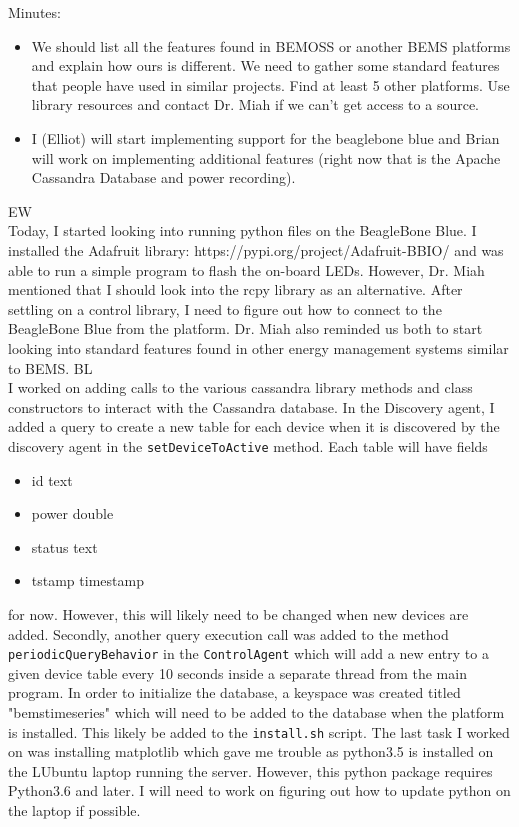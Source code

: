 \documentclass[fontsize=11pt, %
                             paper=letter, %
                             openany, %
                             captions=tableheading,
                             index=totoc,
                             hyperref]{labbook}
\begin{document}
Minutes:
\begin{itemize}
\item We should list all the features found in BEMOSS or another BEMS platforms and explain how ours is different. We need to gather some standard features that people have used in similar projects. Find at least 5 other platforms. Use library resources and contact Dr. Miah if we can't get access to a source.
\item I (Elliot) will start implementing support for the beaglebone blue and Brian will work on implementing additional features (right now that is the Apache Cassandra Database and power recording).
\end{itemize}

EW\\
Today, I started looking into running python files on the BeagleBone Blue. I installed the Adafruit library: https://pypi.org/project/Adafruit-BBIO/ and was able to run a simple program to flash the on-board LEDs. However, Dr. Miah mentioned that I should look into the rcpy library as an alternative. After settling on a control library, I need to figure out how to connect to the BeagleBone Blue from the platform.
Dr. Miah also reminded us both to start looking into standard features found in other energy management systems similar to BEMS.
\medbreak\noindent
BL\\
I worked on adding calls to the various cassandra library methods and class constructors to interact with the Cassandra database. In the Discovery agent, I added a query to create a new table for each device when it is discovered by the discovery agent in the \texttt{setDeviceToActive} method. Each table will have fields
\begin{itemize}
\item id text
\item power double
\item status text
\item tstamp timestamp
\end{itemize}
for now. However, this will likely need to be changed when new devices are added. Secondly, another query execution call was added to the method \texttt{periodicQueryBehavior} in the \texttt{ControlAgent} which will add a new entry to a given device table every 10 seconds inside a separate thread from the main program. In order to initialize the database, a keyspace was created titled "bemstimeseries" which will need to be added to the database when the platform is installed. This likely be added to the \texttt{install.sh} script. The last task I worked on was installing matplotlib which gave me trouble as python3.5 is installed on the LUbuntu laptop running the server. However, this python package requires Python3.6 and later. I will need to work on figuring out how to update python on the laptop if possible. 
\end{document}

